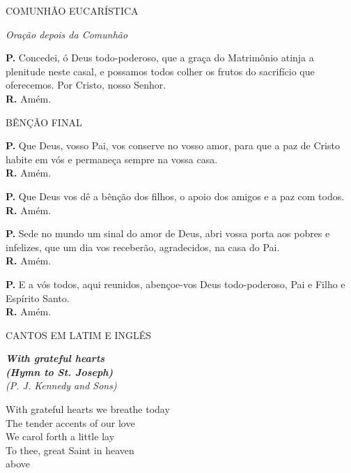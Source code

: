 \documentclass[a5paper,9pt]{memoir}
\begin{document}
{%
\begin{center}
COMUNH\~AO EUCAR\'ISTICA
\end{center}

\hfill {\itshape \color{mygray}Oração depois da Comunh\~ao}

\textbf{P.} Concedei, \'o Deus todo-poderoso, que a gra\c ca do Matrim\^onio atinja a plenitude neste casal, e possamos todos colher os frutos do sacrif\'icio que oferecemos. Por Cristo, nosso Senhor.\\
\textbf{R.} Am\'em.

\begin{center}
BÊNÇÃO FINAL
\end{center}

\textbf{P.} Que Deus, vosso Pai, vos conserve no vosso amor, para que a paz de Cristo habite em v\'os e permane\c ca sempre na vossa casa.\\
\textbf{R.} Am\'em.

\textbf{P.} Que Deus vos d\^e a b\^en\c c\~ao dos filhos, o apoio dos amigos e a paz com todos.\\
\textbf{R.} Am\'em.

\textbf{P.} Sede no mundo um sinal do amor de Deus, abri vossa porta aos pobres e infelizes, que um dia vos receber\~ao, agradecidos, na casa do Pai.\\
\textbf{R.} Am\'em.

\textbf{P.} E a vós todos, aqui reunidos, abençoe-vos Deus todo-poderoso, Pai e Filho  {\color{mygray}\CrossMaltese} e Espírito Santo.\\
\textbf{R.} Amém.

\vfill
\pagebreak

\begin{center}
CANTOS EM LATIM E INGL\^ES
\end{center}
\begin{paracol}{2}
\small
{}
\setlength{\parindent}{0em}
{\itshape
\textbf{With grateful hearts}\\
\textbf{(Hymn to St. Joseph)}\\
(P. J. Kennedy and Sons)


With grateful hearts we breathe today\\
The tender accents of our love\\
We carol forth a little lay\\
To thee, great Saint in heaven\\
above

}
\end{paracol}}
\end{document}
